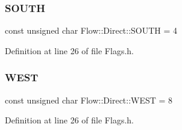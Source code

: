 \subsubsection{\texorpdfstring{S\+O\+U\+TH}{SOUTH}}
{\footnotesize\ttfamily const unsigned char Flow\+::\+Direct\+::\+S\+O\+U\+TH = 4}



Definition at line 26 of file Flags.\+h.

\hypertarget{namespace_flow_1_1_direct_a71884fb1eefd6b366b08e03e8eca5205}{}\label{namespace_flow_1_1_direct_a71884fb1eefd6b366b08e03e8eca5205} 
\subsubsection{\texorpdfstring{W\+E\+ST}{WEST}}
{\footnotesize\ttfamily const unsigned char Flow\+::\+Direct\+::\+W\+E\+ST = 8}



Definition at line 26 of file Flags.\+h.

